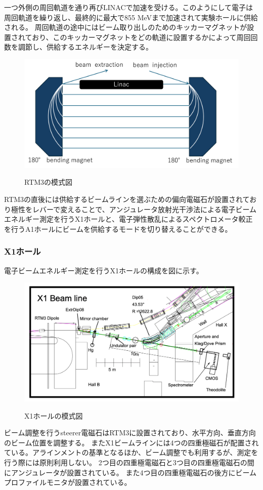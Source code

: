 \documentclass[a4paper,11pt,uplatex]{jsbook}
\begin{document}
一つ外側の周回軌道を通り再びLINACで加速を受ける。このようにして電子は周回軌道を繰り返し、最終的に最大で855 MeVまで加速されて実験ホールに供給される。
周回軌道の途中にはビーム取り出しのためのキッカーマグネットが設置されており、このキッカーマグネットをどの軌道に設置するかによって周回回数を調節し、供給するエネルギーを決定する。
\begin{figure}
  \centering
  \includegraphics[width=0.8\linewidth]{image/3-RTM.png}\\
  \caption{RTM3の模式図}
  \label{RTM3}
\end{figure}

RTM3の直後には供給するビームラインを選ぶための偏向電磁石が設置されており極性をレバーで変えることで、アンジュレータ放射光干渉法による電子ビームエネルギー測定を行うX1ホールと、電子弾性散乱によるスペクトロメータ較正を行うA1ホールにビームを供給するモードを切り替えることができる。

\subsubsection{X1ホール}
電子ビームエネルギー測定を行うX1ホールの構成を図に示す。
\begin{figure}[b]
  \centering
  \includegraphics[width=0.8\linewidth]{image/3-X1.png}\\
  \caption{X1ホールの模式図}
  \label{X1}
\end{figure}
ビーム調整を行うsteerer電磁石はRTM3に設置されており、水平方向、垂直方向のビーム位置を調整する。
またX1ビームラインには4つの四重極磁石が配置されている。アラインメントの基準となるほか、ビーム調整でも利用するが、測定を行う際には原則利用しない。
2つ目の四重極電磁石と3つ目の四重極電磁石の間にアンジュレータが設置されている。
また4つ目の四重極電磁石の後方にビームプロファイルモニタが設置されている。
\end{document}
